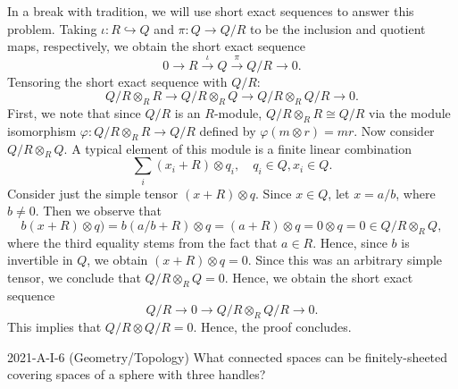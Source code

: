 \documentclass{article}
\begin{document}
\begin{solutions}
	In a break with tradition, we will use short exact sequences to answer this problem. Taking $\iota: R \hookrightarrow Q$ and $\pi: Q \to Q/R$ to be the inclusion and quotient maps, respectively, we obtain the short exact sequence 
		\begin{equation}
			0 \longrightarrow R \xrightarrow{\iota} Q \xrightarrow{\pi} Q/R \longrightarrow 0. 
		\end{equation}
	Tensoring the short exact sequence with $Q/R$: 
		\begin{equation}
			Q/R \mathop{\otimes}_{R} R \longrightarrow Q/R \mathop{\otimes}_{R} Q \longrightarrow Q/R \mathop{\otimes}_{R} Q/R \longrightarrow 0. 
		\end{equation}
	First, we note that since $Q/R$ is an $R$-module, $Q/R \mathop{\otimes}_{R} R \cong Q/R$ via the module isomorphism $\varphi: Q/R \mathop{\otimes}_{R}R \to Q/R$ defined by $\varphi(m \otimes r) = mr$. Now consider $Q/R \mathop{\otimes}_{R} Q$. A typical element of this module is a finite linear combination 
		\begin{equation}
			\sum_{i}(x_{i} + R) \otimes q_{i}, \quad q_{i} \in Q, x_{i} \in Q. 
		\end{equation}
	Consider just the simple tensor $(x + R) \otimes q$. Since $x \in Q$, let $x = a/b$, where $b \neq 0$. Then we observe that 
		\begin{equation}
			b(x + R) \otimes q) = b(a/b + R) \otimes q = (a + R) \otimes q = 0 \otimes q = 0 \in Q/R \mathop{\otimes}_{R} Q,
		\end{equation}
	where the third equality stems from the fact that $a \in R$. Hence, since $b$ is invertible in $Q$, we obtain $(x + R) \otimes q = 0$. Since this was an arbitrary simple tensor, we conclude that $Q/R \mathop{\otimes}_{R} Q = 0$. Hence, we obtain the short exact sequence 
		\begin{equation}
			Q/R \longrightarrow 0 \longrightarrow Q/R \mathop{\otimes}_{R} Q/R \longrightarrow 0. 
		\end{equation}
	This implies that $Q/R \mathop{\otimes} Q/R = 0$. Hence, the proof concludes. 
\end{solutions}
\begin{prb}{2021-A-I-6 (Geometry/Topology)}
	What connected spaces can be finitely-sheeted covering spaces of a sphere with three handles? 
\end{prb}
\end{document}
